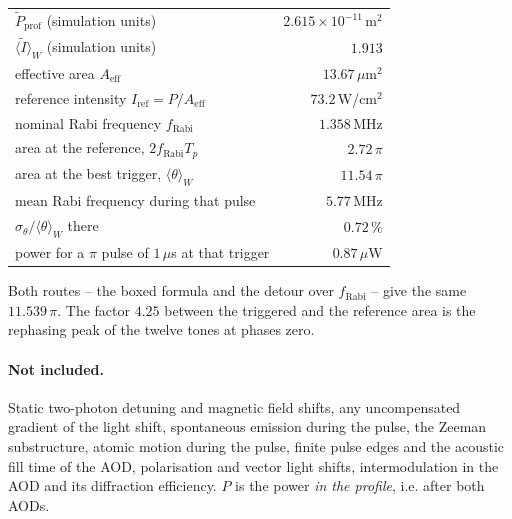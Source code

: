 \begin{center}
\begin{tabular}{lr}
\hline
$\tilde P_\mathrm{prof}$ (simulation units) & $2.615\times10^{-11}$\,m$^2$\\
$\langle\tilde I\rangle_W$ (simulation units) & $1.913$\\
effective area $A_\mathrm{eff}$ & $13.67\,\mu$m$^2$\\
reference intensity $I_\mathrm{ref}=P/A_\mathrm{eff}$ & $73.2$\,W/cm$^2$\\
nominal Rabi frequency $f_\mathrm{Rabi}$ & $1.358$\,MHz\\
area at the reference, $2f_\mathrm{Rabi}T_p$ & $2.72\,\pi$\\
area at the best trigger, $\langle\theta\rangle_W$ & $11.54\,\pi$\\
mean Rabi frequency during that pulse & $5.77$\,MHz\\
$\sigma_\theta/\langle\theta\rangle_W$ there & $0.72\,\%$\\
power for a $\pi$ pulse of $1\,\mu$s at that trigger & $0.87\,\mu$W\\
\hline
\end{tabular}
\end{center}

Both routes -- the boxed formula and the detour over $f_\mathrm{Rabi}$ -- give
the same $11.539\,\pi$. The factor $4.25$ between the triggered and the
reference area is the rephasing peak of the twelve tones at phases zero.

\paragraph{Not included.}
Static two-photon detuning and magnetic field shifts, any uncompensated
gradient of the light shift, spontaneous emission during the pulse, the Zeeman
substructure, atomic motion during the pulse, finite pulse edges and the
acoustic fill time of the AOD, polarisation and vector light shifts,
intermodulation in the AOD and its diffraction efficiency. $P$ is the power
\emph{in the profile}, i.e. after both AODs.
